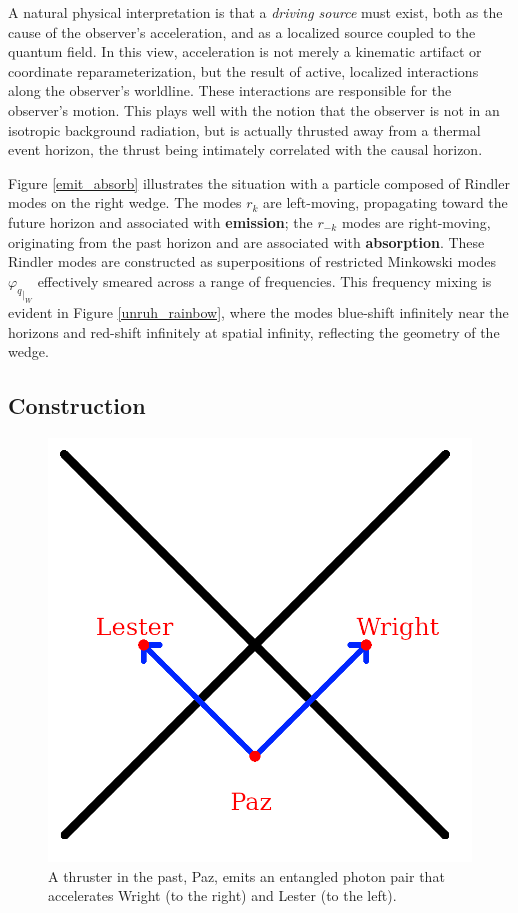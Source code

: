 \documentclass[12pt,a4paper]{article}
\begin{document}
A natural physical interpretation is that a {\it driving source} must exist, both as the cause of the observer’s acceleration, and as a localized source coupled to the quantum field. In this view, acceleration is not merely a kinematic artifact or coordinate reparameterization, but the result of active, localized interactions along the observer’s worldline. These interactions are responsible for the observer’s motion.  This plays well with the notion that the observer is not in an isotropic background radiation, but is actually thrusted away from a thermal event horizon, the thrust being intimately correlated with the causal horizon.


Figure \ref{emit_absorb} illustrates the situation with a particle composed of Rindler modes on the right wedge. The modes $r_k$ are left-moving, propagating toward the future horizon and associated with {\bf emission}; the $r_{-k}$ modes are right-moving, originating from the past horizon and are associated with {\bf absorption}. These Rindler modes are constructed as superpositions of restricted Minkowski modes ${\varphi_q}_{|_W}$ effectively smeared across a range of frequencies.  This frequency mixing is evident in Figure \ref{unruh_rainbow}, where the modes blue-shift infinitely near the horizons and red-shift infinitely at spatial infinity, reflecting the geometry of the wedge.

\subsection{Construction}

\begin{figure}[h]
\centering
\includegraphics[scale=0.75]{paz.png}
\captionsetup{width=0.7\textwidth}
\caption{A thruster in the past, Paz, emits an entangled photon pair that accelerates Wright (to the right) and Lester (to the left).}
\label{paz}
\end{figure}
\end{document}
